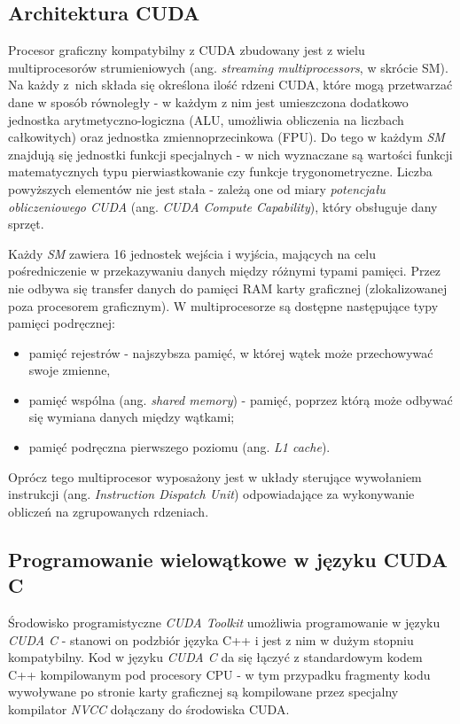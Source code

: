 \documentclass[12pt]{article}
\begin{document}
\subsection{Architektura CUDA}

Procesor graficzny kompatybilny z CUDA zbudowany jest z wielu multiprocesorów strumieniowych (ang. \textit{streaming multiprocessors}, w skrócie SM). Na każdy z~nich składa się określona ilość rdzeni CUDA, które mogą przetwarzać dane w sposób równoległy - w każdym z nim jest umieszczona dodatkowo jednostka arytmetyczno-logiczna (ALU, umożliwia obliczenia na liczbach całkowitych) oraz jednostka zmiennoprzecinkowa (FPU). Do tego w każdym \textit{SM} znajdują się jednostki funkcji specjalnych - w nich wyznaczane są wartości funkcji matematycznych typu pierwiastkowanie czy funkcje trygonometryczne. Liczba powyższych elementów nie jest stała - zależą one od miary \textit{potencjału obliczeniowego CUDA} (ang. \textit{CUDA Compute Capability}), który obsługuje dany sprzęt.

Każdy \textit{SM} zawiera 16 jednostek wejścia i wyjścia, mających na celu pośredniczenie w przekazywaniu danych między różnymi typami pamięci. Przez nie odbywa się transfer danych do pamięci RAM karty graficznej (zlokalizowanej poza procesorem graficznym). W multiprocesorze są dostępne następujące typy pamięci podręcznej:

\begin{itemize}
\item pamięć rejestrów - najszybsza pamięć, w której wątek może przechowywać swoje zmienne,
\item pamięć wspólna (ang. \textit{shared memory}) - pamięć, poprzez którą może odbywać się wymiana danych między wątkami;
\item pamięć podręczna pierwszego poziomu (ang. \textit{L1 cache}).
\end{itemize}

Oprócz tego multiprocesor wyposażony jest w układy sterujące wywołaniem instrukcji (ang. \textit{Instruction Dispatch Unit}) odpowiadające za wykonywanie obliczeń na zgrupowanych rdzeniach.

\subsection{Programowanie wielowątkowe w języku CUDA C}

Środowisko programistyczne \textit{CUDA Toolkit} umożliwia programowanie w języku \textit{CUDA C} - stanowi on podzbiór języka C++ i jest z nim w dużym stopniu kompatybilny. Kod w języku \textit{CUDA C} da się łączyć z standardowym kodem C++ kompilowanym pod procesory CPU - w tym przypadku fragmenty kodu wywoływane po stronie karty graficznej są kompilowane przez specjalny kompilator \textit{NVCC} dołączany do środowiska CUDA. 
\end{document}
